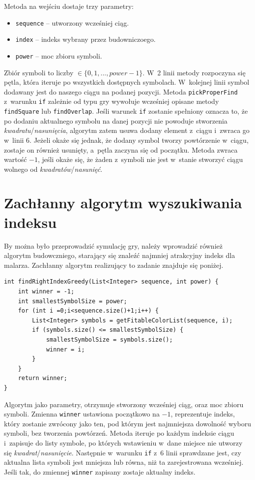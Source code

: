 \documentclass[document]{xmgr}
\begin{document}
Metoda na wejściu dostaje trzy parametry:
\begin{itemize}
\item \texttt{sequence} -- utworzony wcześniej ciąg.
\item \texttt{index} -- indeks wybrany przez budowniczoego.
\item \texttt{power} -- moc zbioru symboli.
\end{itemize}
Zbiór symboli to liczby $\in \{0, 1, ..., power-1\}$. W~2 linii metody rozpoczyna się pętla, która iteruje po wszystkich dostępnych symbolach. W~kolejnej linii symbol dodawany jest do naszego ciągu na podanej pozycji. Metoda \texttt{pickProperFind} z~warunku \texttt{if} zależnie od typu gry wywołuje wcześniej opisane metody \texttt{findSquare} lub \texttt{findOverlap}. Jeśli warunek \texttt{if} zostanie spełniony oznacza to, że po dodaniu aktualnego symbolu na danej pozycji nie powoduje stworzenia \emph{kwadratu}/\emph{nasunięcia}, algorytm zatem usuwa dodany element z~ciągu i~zwraca go w~linii 6. Jeżeli  okaże się jednak, że dodany symbol tworzy powtórzenie w~ciągu, zostaje on również usunięty, a~pętla zaczyna się od początku. Metoda zwraca wartość $-1$, jeśli okaże się, że żaden z~symboli nie jest w~stanie stworzyć ciągu wolnego od \emph{kwadratów}/\emph{nasunięć}.

\section{Zachłanny algorytm wyszukiwania indeksu}
By można było przeprowadzić symulację gry, należy wprowadzić również algorytm budowczniego, starający się znaleźć najmniej atrakcyjny indeks dla malarza. Zachłanny algorytm realizujący to zadanie znajduje się poniżej.

\begin{lstlisting}[frame=single]
int findRightIndexGreedy(List<Integer> sequence, int power) {
	int winner = -1;
	int smallestSymbolSize = power;
	for (int i =0;i<sequence.size()+1;i++) {
		List<Integer> symbols = getFitableColorList(sequence, i);
		if (symbols.size() <= smallestSymbolSize) {
			smallestSymbolSize = symbols.size();
			winner = i;
		}
	}
	return winner;
}
\end{lstlisting}

Algorytm jako parametry, otrzymuje stworzony wcześniej ciąg, oraz moc zbioru symboli. Zmienna \texttt{winner} ustawiona początkowo na $-1$, reprezentuje indeks, który zostanie zwrócony jako ten, pod którym jest najmniejsza dowolność wyboru symboli, bez tworzenia powtórzeń. Metoda iteruje po każdym indeksie ciągu i~zapisuje do listy symbole, po których wstawieniu w~dane miejsce nie utworzy się \emph{kwadrat}/\emph{nasunięcie}. Następnie w~warunku \texttt{if} z~6 linii sprawdzane jest, czy aktualna lista symboli jest mniejsza lub równa, niż ta zarejestrowana wcześniej. Jeśli tak, do zmiennej \texttt{winner} zapisany zostaje aktualny indeks.
\end{document}
